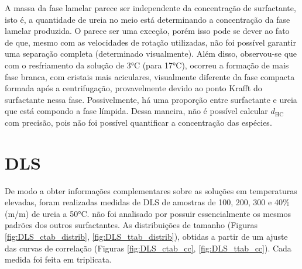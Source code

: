 	A massa da fase lamelar parece ser independente da concentração de surfactante, isto é, a quantidade de ureia no meio está determinando a concentração da fase lamelar produzida. O \CTAB{} parece ser uma exceção, porém isso pode se dever ao fato de que, mesmo com as velocidades de rotação utilizadas, não foi possível garantir uma separação completa (determinado visualmente). Além disso, observou-se que com o resfriamento da solução de 3°C (para 17°C), ocorreu a formação de mais fase branca, com cristais mais aciculares, visualmente diferente da fase compacta formada após a centrifugação, provavelmente devido ao ponto Krafft do surfactante nessa fase. Possivelmente, há uma proporção entre surfactante e ureia que está compondo a fase límpida. Dessa maneira, não é possível calcular \(d_\mathrm{HC}\) com precisão, pois não foi possível quantificar a concentração das espécies. 
	\FloatBarrier
\section{DLS}
\label{sec:Ureia-DLS}

	De modo a obter informações complementares sobre as soluções em temperaturas elevadas, foram realizadas medidas de DLS de amostras de \CTTAB{} 100, 200, 300 \mM{} e 40\% (m/m) de ureia a 50°C. \DTAB{} não foi analisado por possuir essencialmente os mesmos padrões dos outros surfactantes. As distribuições de tamanho (Figuras \ref{fig:DLS_ctab_distrib}, \ref{fig:DLS_ttab_distrib}), obtidas a partir de um ajuste das curvas de correlação (Figuras \ref{fig:DLS_ctab_cc}, \ref{fig:DLS_ttab_cc}). Cada medida foi feita em triplicata.
	


